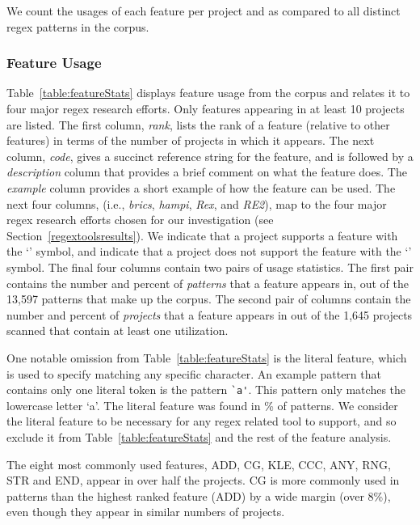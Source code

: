 We  count the usages of each feature per project and as compared to all distinct regex patterns in the corpus.



\subsubsection{Feature Usage}
\label{sec:featureUsage}
Table~\ref{table:featureStats} displays feature usage from the corpus and relates it to four major regex research efforts. Only features appearing in at least 10 projects are listed.
The first column, \emph{rank}, lists the rank of a feature (relative to other features) in terms of the number of projects in which it appears. The next column, \emph{code}, gives a succinct reference string for the feature, and is followed by a \emph{description} column that provides a brief comment on what the feature does.  The \emph{example} column provides a short example of how the feature can be used.
The next four columns, (i.e., \emph{brics}, \emph{hampi}, \emph{Rex}, and \emph{RE2}), map to the four major regex research efforts chosen for our investigation (see Section~\ref{regextoolsresults}).  We indicate that a project supports a feature with the `\yes' symbol, and indicate that a project does not support the feature with the `\no' symbol.
The final four columns contain two pairs of usage statistics.  The first pair contains the number and percent of \emph{patterns} that a feature appears in, out of the 13,597 patterns that make up the corpus.  The second pair of columns contain the number and percent of \emph{projects} that a feature appears in out of the 1,645 projects scanned that contain at least one utilization.

One notable omission from Table~\ref{table:featureStats} is the literal feature, which is used  to specify matching any specific character.  An example pattern that contains only one literal token is the pattern \verb!`a'!.  This pattern only matches the lowercase letter `a'.  The literal feature was found in \% of patterns.
We consider the literal feature to be necessary for any regex related tool to support, and so exclude it from Table~\ref{table:featureStats} and the rest of the feature analysis.



The eight most commonly used features, ADD, CG, KLE, CCC, ANY, RNG, STR and END,
appear in over half the projects.
CG is more commonly used in patterns than the highest ranked feature (ADD) by a wide margin (over 8\%), even though they appear in similar numbers of projects.

